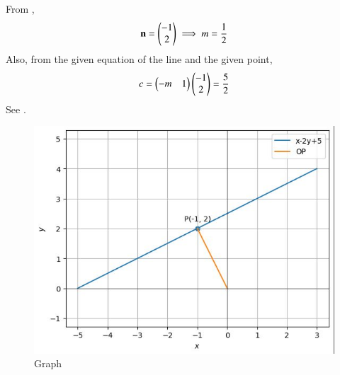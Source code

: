 From ,
\begin{align}
	\mathbf{n} = \begin{pmatrix}-1\\2\end{pmatrix} \implies m = \frac{1}{2}
\end{align}
Also, from the given equation of the line and the given point, 
\begin{align}
	c = \begin{pmatrix}-m & 1\end{pmatrix}\begin{pmatrix}-1\\2\end{pmatrix} = 
\frac{5}{2}  
\end{align}
 See .
\begin{figure}[!ht]
 \centering
\includegraphics[width=\columnwidth]{chapters/11/10/3/15/figs/graph.jpg}
 \caption{Graph}
 \label{fig:pic}
\end{figure}

